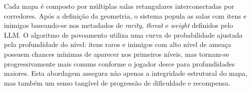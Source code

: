 Cada mapa é composto por múltiplas salas retangulares interconectadas por
corredores. Após a definição da geometria, o sistema popula as salas com itens e
inimigos baseando-se nos metadados de \textit{rarity}, \textit{threat} e
\textit{weight} definidos pelo \gls{LLM}. O algoritmo de povoamento utiliza uma
curva de probabilidade ajustada pela profundidade do nível: itens raros e
inimigos com alto nível de ameaça possuem chances mínimas de aparecer nos
primeiros níveis, mas tornam-se progressivamente mais comuns conforme o jogador
desce para profundidades maiores. Esta abordagem assegura não apenas a
integridade estrutural do mapa, mas também um senso tangível de progressão de
dificuldade e recompensa.